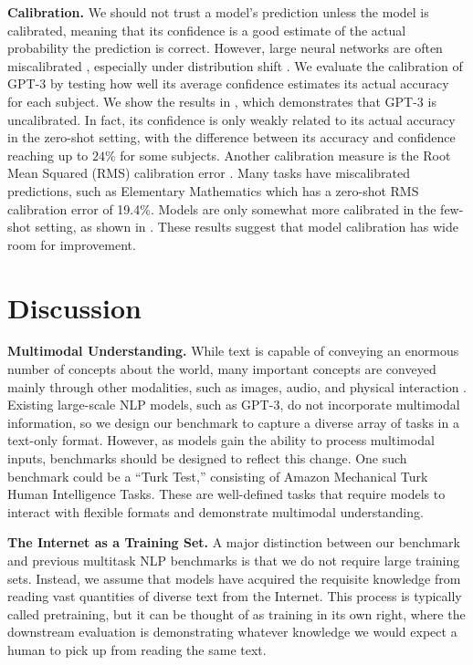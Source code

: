 \documentclass{article}
\begin{document}
\noindent\textbf{Calibration.}\quad
We should not trust a model's prediction unless the model is calibrated, meaning that its confidence is a good estimate of the actual probability the prediction is correct. However, large neural networks are often miscalibrated \citep{kilian2017calibration}, especially under distribution shift \citep{ovadia2019can}. 
We evaluate the calibration of GPT-3 by testing how well its average confidence estimates its actual accuracy for each subject.
We show the results in , which demonstrates that GPT-3 is uncalibrated. In fact, its confidence is only weakly related to its actual accuracy in the zero-shot setting, with the difference between its accuracy and confidence reaching up to $24\%$ for some subjects.
Another calibration measure is the Root Mean Squared (RMS) calibration error \citep{hendrycks2019oe,kumar2019verifiedcalibration}. Many tasks have miscalibrated predictions, such as Elementary Mathematics which has a zero-shot RMS calibration error of 19.4\%. Models are only somewhat more calibrated in the few-shot setting, as shown in .
These results suggest that model calibration has wide room for improvement.

\section{Discussion}
\noindent\textbf{Multimodal Understanding.}\quad
While text is capable of conveying an enormous number of concepts about the world, many important concepts are conveyed mainly through other modalities, such as images, audio, and physical interaction \citep{bisk2020experiencegroundslang}. Existing large-scale NLP models, such as GPT-3, do not incorporate multimodal information, so we design our benchmark to capture a diverse array of tasks in a text-only format. However, as models gain the ability to process multimodal inputs, benchmarks should be designed to reflect this change. One such benchmark could be a ``Turk Test,'' consisting of Amazon Mechanical Turk Human Intelligence Tasks. These are well-defined tasks that require models to interact with flexible formats and demonstrate multimodal understanding.

\noindent\textbf{The Internet as a Training Set.}\quad
A major distinction between our benchmark and previous multitask NLP benchmarks is that we do not require large training sets. Instead, we assume that models have acquired the requisite knowledge from reading vast quantities of diverse text from the Internet. This process is typically called pretraining, but it can be thought of as training in its own right, where the downstream evaluation is demonstrating whatever knowledge we would expect a human to pick up from reading the same text. 
\end{document}
